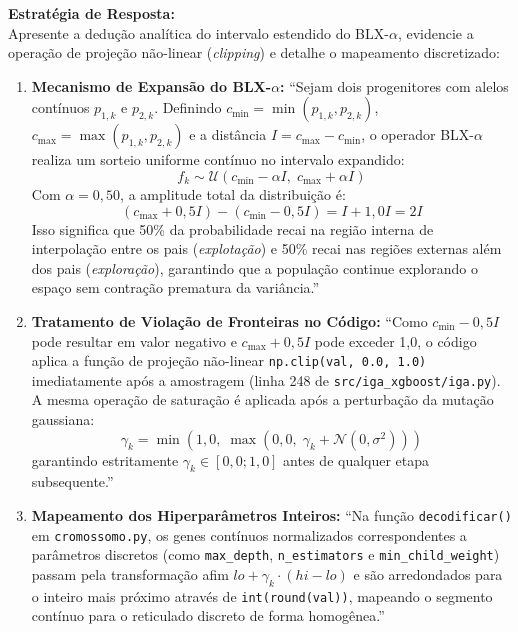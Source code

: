 \documentclass[11pt,a4paper]{article}
\begin{document}
\begin{boardAnswer}
\textbf{Estratégia de Resposta:}\\
Apresente a dedução analítica do intervalo estendido do BLX-$\alpha$, evidencie a operação de projeção não-linear (\textit{clipping}) e detalhe o mapeamento discretizado:

\begin{enumerate}[leftmargin=0.8cm]
  \item \textbf{Mecanismo de Expansão do BLX-$\alpha$:} ``Sejam dois progenitores com alelos contínuos $p_{1, k}$ e $p_{2, k}$. Definindo $c_{\min} = \min(p_{1, k}, p_{2, k})$, $c_{\max} = \max(p_{1, k}, p_{2, k})$ e a distância $I = c_{\max} - c_{\min}$, o operador BLX-$\alpha$ realiza um sorteio uniforme contínuo no intervalo expandido:
  \begin{equation}
    f_k \sim \mathcal{U}\left( c_{\min} - \alpha I, \; c_{\max} + \alpha I \right)
  \end{equation}
  Com $\alpha = 0{,}50$, a amplitude total da distribuição é:
  \begin{equation}
    (c_{\max} + 0{,}5 I) - (c_{\min} - 0{,}5 I) = I + 1{,}0 I = 2I
  \end{equation}
  Isso significa que 50\% da probabilidade recai na região interna de interpolação entre os pais (\textit{explotação}) e 50\% recai nas regiões externas além dos pais (\textit{exploração}), garantindo que a população continue explorando o espaço sem contração prematura da variância.''
  \item \textbf{Tratamento de Violação de Fronteiras no Código:} ``Como $c_{\min} - 0{,}5 I$ pode resultar em valor negativo e $c_{\max} + 0{,}5 I$ pode exceder 1,0, o código aplica a função de projeção não-linear \texttt{np.clip(val, 0.0, 1.0)} imediatamente após a amostragem (linha 248 de \texttt{src/iga\_xgboost/iga.py}). A mesma operação de saturação é aplicada após a perturbação da mutação gaussiana:
  \begin{equation}
    \gamma_k = \min\left(1{,}0, \; \max\left(0{,}0, \; \gamma_k + \mathcal{N}(0, \sigma^2)\right)\right)
  \end{equation}
  garantindo estritamente $\gamma_k \in [0{,}0; 1{,}0]$ antes de qualquer etapa subsequente.''
  \item \textbf{Mapeamento dos Hiperparâmetros Inteiros:} ``Na função \texttt{decodificar()} em \texttt{cromossomo.py}, os genes contínuos normalizados correspondentes a parâmetros discretos (como \texttt{max\_depth}, \texttt{n\_estimators} e \texttt{min\_child\_weight}) passam pela transformação afim $lo + \gamma_k \cdot (hi - lo)$ e são arredondados para o inteiro mais próximo através de \texttt{int(round(val))}, mapeando o segmento contínuo para o reticulado discreto de forma homogênea.''
\end{enumerate}
\end{boardAnswer}
\end{document}
